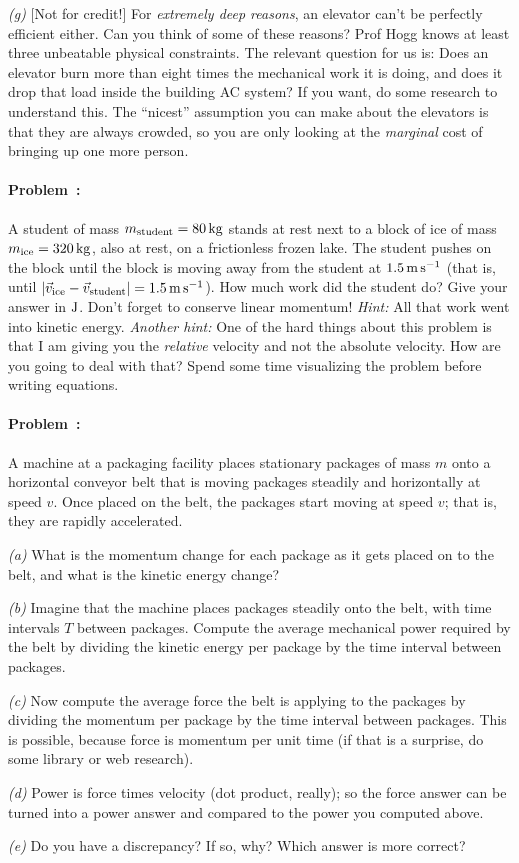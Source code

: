 \documentclass[12pt]{article}
\begin{document}
\textsl{(g)} [Not for credit!] For \emph{extremely deep reasons}, an
elevator can't be perfectly efficient either. Can you think of some of
these reasons? Prof Hogg knows at least three unbeatable physical
constraints. The relevant question for us is: Does an elevator burn
more than eight times the mechanical work it is doing, and does it
drop that load inside the building AC system? If you want, do some
research to understand this. The ``nicest'' assumption you can make
about the elevators is that they are always crowded, so you are only
looking at the \emph{marginal} cost of bringing up one more person.

\paragraph{Problem~\theproblem:}%
A student of mass $m_\mathrm{student}=80\,\mathrm{kg}$ stands at rest next to
a block of ice of mass $m_\mathrm{ice}=320\,\mathrm{kg}$, also at rest, on a
frictionless frozen lake.  The student pushes on the block until the
block is moving away from the student at $1.5\,\mathrm{m}\,\mathrm{s}^{-1}$ (that is, until
$\left|\vec{v}_\mathrm{ice}-\vec{v}_\mathrm{student}\right|=1.5\,\mathrm{m}\,\mathrm{s}^{-1}$).
How much work did the student do?  Give your answer in $\mathrm{J}$.  Don't
forget to conserve linear momentum!  \emph{Hint:} All that work went into
kinetic energy.  \emph{Another hint:} One of the hard things about
this problem is that I am giving you the \emph{relative} velocity and
not the absolute velocity.  How are you going to deal with that?
Spend some time visualizing the problem before writing equations.

\paragraph{Problem~\theproblem:}%
A machine at a packaging facility places stationary packages of mass
$m$ onto a horizontal conveyor belt that is moving packages steadily
and horizontally at speed $v$. Once placed on the belt, the packages
start moving at speed $v$; that is, they are rapidly accelerated.

\textsl{(a)} What is the momentum change for each package as it
gets placed on to the belt, and what is the kinetic energy change?

\textsl{(b)} Imagine that the machine places packages steadily onto
the belt, with time intervals $T$ between packages. Compute the
average mechanical power required by the belt by dividing the kinetic
energy per package by the time interval between packages.

\textsl{(c)} Now compute the average force the belt is applying to the
packages by dividing the momentum per package by the time interval
between packages. This is possible, because force is momentum per unit
time (if that is a surprise, do some library or web research).

\textsl{(d)} Power is force times velocity (dot product, really); so
the force answer can be turned into a power answer and compared to the
power you computed above.

\textsl{(e)} Do you have a discrepancy? If so, why? Which answer is
more correct?
\end{document}

